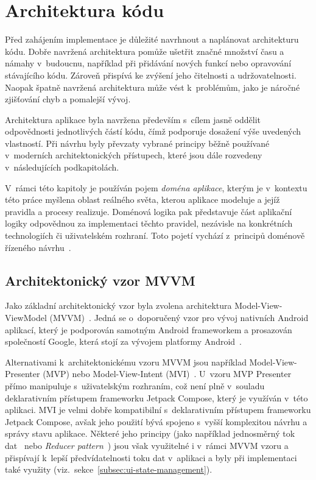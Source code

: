 \chapter{Architektura kódu}\label{ch:architektura}
Před zahájením implementace je důležité navrhnout a naplánovat architekturu kódu.
Dobře navržená architektura pomůže ušetřit značné množství času a námahy v~budoucnu, například při přidávání nových funkcí nebo opravování stávajícího kódu.
Zároveň přispívá ke zvýšení jeho čitelnosti a udržovatelnosti.
Naopak špatně navržená architektura může vést k~problémům, jako je náročné zjišťování chyb a pomalejší vývoj.

Architektura aplikace byla navržena především s~cílem jasně oddělit odpovědnosti jednotlivých částí kódu, čímž podporuje dosažení výše uvedených vlastností.
Při návrhu byly převzaty vybrané principy běžně používané v~moderních architektonických přístupech, které jsou dále rozvedeny v~následujících podkapitolách.

V~rámci této kapitoly je používán pojem \emph{doména aplikace}, kterým je v~kontextu této práce myšlena oblast reálného světa, kterou aplikace modeluje a jejíž pravidla a procesy realizuje.
Doménová logika pak představuje část aplikační logiky odpovědnou za implementaci těchto pravidel, nezávisle na konkrétních technologiích či uživatelském rozhraní.
Toto pojetí vychází z~principů doménově řízeného návrhu~\parencite{evans_ddd}.


\section{Architektonický vzor MVVM}\label{sec:mvvm}
Jako základní architektonický vzor byla zvolena architektura Model-View-ViewModel (MVVM)~\parencite{mvvm, android_mvvm}.
Jedná se o~doporučený vzor pro vývoj nativních Android aplikací, který je podporován samotným Android frameworkem a prosazován společností Google, která stojí za vývojem platformy Android~\parencite{android_recommended_architecture}.

Alternativami k~architektonickému vzoru MVVM jsou například Model-View-Presenter (MVP) nebo Model-View-Intent (MVI)~\parencite{mvp_mvvm_mvi}.
U~vzoru MVP Presenter přímo manipuluje s~uživatelským rozhraním, což není plně v~souladu deklarativním přístupem frameworku Jetpack Compose, který je využíván v~této aplikaci.
MVI je velmi dobře kompatibilní s~deklarativním přístupem frameworku Jetpack Compose, avšak jeho použití bývá spojeno s~vyšší komplexitou návrhu a správy stavu aplikace.
Některé jeho principy (jako například jednosměrný tok dat~\parencite{android_recommended_architecture} nebo \textit{Reducer pattern}~\parencite{redux_reducer_pattern}) jsou však využitelné i v~rámci MVVM vzoru a přispívají k~lepší předvídatelnosti toku dat v~aplikaci a byly při implementaci také využity (viz.\ sekce~\ref{subsec:ui-state-management}).


